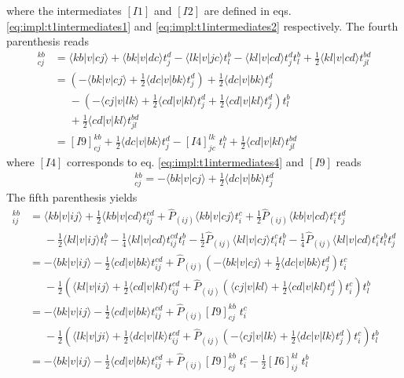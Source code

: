 where the intermediates $[I1]$ and $[I2]$ are defined in eqs. \ref{eq:impl:t1intermediates1} and \ref{eq:impl:t1intermediates2} respectively. The fourth parenthesis reads
\begin{align}
[I8]_{cj}^{kb} &=\langle kb|v|cj\rangle + \langle bk|v|dc\rangle t_j^d-\langle lk|v|jc\rangle t_l^b-\langle kl|v|cd\rangle t_j^dt_l^b+\frac{1}{2}\langle kl|v|cd\rangle t_{jl}^{bd}\nonumber\\
&=\left(-\langle bk|v|cj\rangle + \frac{1}{2}\langle dc|v|bk\rangle t_j^d\right)+\frac{1}{2}\langle dc|v|bk\rangle t_j^d\nonumber\\
&\phantom{=}-\left(-\langle cj|v|lk\rangle+\frac{1}{2}\langle cd|v|kl\rangle t_j^d+\frac{1}{2}\langle cd|v|kl\rangle t_j^d\right)t_l^b\nonumber\\
&\phantom{=}+\frac{1}{2}\langle cd|v|kl\rangle t_{jl}^{bd}\nonumber\\
&=[I9]_{cj}^{kb}+\frac{1}{2}\langle dc|v|bk\rangle t_j^d-[I4]_{jc}^{lk}\phantom{.}t_l^b+\frac{1}{2}\langle cd|v|kl\rangle t_{jl}^{bd}
\label{eq:impl:t2intermediates8}
\end{align}
where $[I4]$ corresponds to eq. \ref{eq:impl:t1intermediates4} and $[I9]$ reads
\begin{align}
[I9]_{cj}^{kb} = -\langle bk|v|cj\rangle + \frac{1}{2}\langle dc|v|bk\rangle t_j^d
\label{eq:impl:t2intermediates9}
\end{align}
The fifth parenthesis yields
\begin{align}
[I10]_{ij}^{kb}&= \langle kb|v|ij\rangle +\frac{1}{2}\langle kb|v|cd\rangle t_{ij}^{cd}+\hat{P}_{(ij)}\langle kb|v|cj\rangle t_i^c+\frac{1}{2}\hat{P}_{(ij)}\langle kb|v|cd\rangle t_i^ct_j^d\nonumber\\
&\phantom{=}-\frac{1}{2}\langle kl|v|ij\rangle t_l^b-\frac{1}{4}\langle kl|v|cd\rangle t_{ij}^{cd}t_l^b-\frac{1}{2}\hat{P}_{(ij)}\langle kl|v|cj\rangle t_i^ct_l^b-\frac{1}{4}\hat{P}_{(ij)}\langle kl|v|cd\rangle t_i^ct_l^bt_j^d\nonumber\\
&=-\langle bk|v|ij\rangle-\frac{1}{2}\langle cd|v|bk\rangle t_{ij}^{cd}+\hat{P}_{(ij)}\left(-\langle bk|v|cj\rangle+ \frac{1}{2}\langle dc|v|bk\rangle t_j^d \right)t_i^c\nonumber\\
&\phantom{=}-\frac{1}{2}\left(\langle kl|v|ij\rangle+\frac{1}{2}\langle cd|v|kl\rangle t_{ij}^{cd}+\hat{P}_{(ij)}\left(\langle cj|v|kl\rangle+ \frac{1}{2}\langle cd|v|kl\rangle t_j^d\right)t_i^c\right)t_l^b\nonumber\\
&=-\langle bk|v|ij\rangle-\frac{1}{2}\langle cd|v|bk\rangle t_{ij}^{cd}+\hat{P}_{(ij)}[I9]_{cj}^{kb}\phantom{.}t_i^c\nonumber\\
&\phantom{=}-\frac{1}{2}\left(\langle lk|v|ji\rangle+\frac{1}{2}\langle dc|v|lk\rangle t_{ij}^{cd}+\hat{P}_{(ij)}\left(-\langle cj|v|lk\rangle+ \frac{1}{2}\langle dc|v|lk\rangle t_j^d\right)t_i^c\right)t_l^b\nonumber\\
&=-\langle bk|v|ij\rangle-\frac{1}{2}\langle cd|v|bk\rangle t_{ij}^{cd}+\hat{P}_{(ij)}[I9]_{cj}^{kb}\phantom{.}t_i^c-\frac{1}{2} [I6]_{ij}^{kl}\phantom{.}t_l^b
\label{eq:impl:t2intermediates10}
\end{align}


